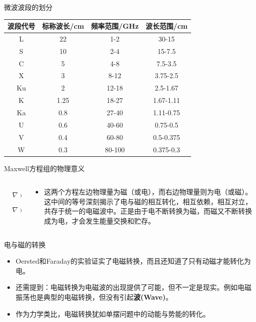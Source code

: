 \documentclass{ctexbeamer}
\begin{document}
\begin{frame}{微波波段的划分}
  \begin{tabular}{cccc}
    \toprule
    波段代号 & 标称波长/cm & 频率范围/GHz & 波长范围/cm \\
    \midrule
     L & 22 & 1-2 & 30-15 \\
     S & 10 & 2-4 & 15-7.5 \\
     C & 5 & 4-8 & 7.5-3.5 \\
     X & 3 & 8-12 & 3.75-2.5 \\
     Ku & 2 & 12-18 & 2.5-1.67 \\
     K & 1.25 & 18-27 & 1.67-1.11 \\
     Ka & 0.8 & 27-40 & 1.11-0.75 \\
     U & 0.6 & 40-60 & 0.75-0.5 \\
     V & 0.4 & 60-80 & 0.5-0.375 \\
     W & 0.3 & 80-100 & 0.375-0.3 \\
    \bottomrule
  \end{tabular}
\end{frame}

\begin{frame}{Maxwell方程组的物理意义}
  \begin{columns}
    \begin{column}{0.4\linewidth}
      \begin{align*}
        & \nabla\times\vec{E} = -\frac{\partial \vec{B}}{\partial t}\\
        & \nabla\times\vec{H} = \vec{J}+\frac{\partial \vec{D}}{\partial t}
      \end{align*}
    \end{column}
    \begin{column}{0.6\linewidth}
      \begin{itemize}
        \item 这两个方程左边物理量为磁（或电），而右边物理量则为电（或磁）。这中间的等号深刻揭示了电与磁的相互转化，相互依赖，相互对立，共存于统一的电磁波中。正是由于电不断转换为磁，而磁又不断转换成为电，才会发生能量交换和贮存。
      \end{itemize}
    \end{column}
  \end{columns}
\end{frame}

\begin{frame}{电与磁的转换}
  \begin{itemize}
    \item Oersted和Faraday的实验证实了电磁转换，而且还知道了只有动磁才能转化为电。
    \item 还需提到：电磁转换为电磁波的出现提供了可能，但不一定是现实。例如电磁振荡也是典型的电磁转换，但没有引起\textbf{波(Wave)}。
    \item 作为力学类比，电磁转换犹如单摆问题中的动能与势能的转化。
  \end{itemize}
\end{frame}
\end{document}
